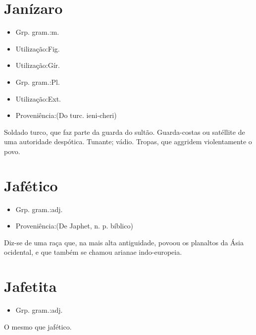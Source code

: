 \documentclass{article}
\begin{document}
\section{Janízaro}
\begin{itemize}
\item {Grp. gram.:m.}
\end{itemize}
\begin{itemize}
\item {Utilização:Fig.}
\end{itemize}
\begin{itemize}
\item {Utilização:Gír.}
\end{itemize}
\begin{itemize}
\item {Grp. gram.:Pl.}
\end{itemize}
\begin{itemize}
\item {Utilização:Ext.}
\end{itemize}
\begin{itemize}
\item {Proveniência:(Do turc. \textunderscore ieni-cheri\textunderscore )}
\end{itemize}
Soldado turco, que faz parte da guarda do sultão.
Guarda-costas ou satéllite de uma autoridade despótica.
Tunante; vádio.
Tropas, que aggridem violentamente o povo.
\section{Jafético}
\begin{itemize}
\item {Grp. gram.:adj.}
\end{itemize}
\begin{itemize}
\item {Proveniência:(De \textunderscore Japhet\textunderscore , n. p. bíblico)}
\end{itemize}
Diz-se de uma raça que, na mais alta antiguidade, povoou os planaltos da Ásia ocidental, e que também se chamou \textunderscore ariana\textunderscore  e \textunderscore indo-europeia\textunderscore .
\section{Jafetita}
\begin{itemize}
\item {Grp. gram.:adj.}
\end{itemize}
O mesmo que \textunderscore jafético\textunderscore .
\end{document}
